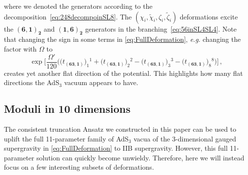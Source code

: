 \documentclass[a4paper, 11pt]{article}
\numberwithin{equation}{section}
\newcommand{\ts}[1]{\widetilde{#1}}
\newcommand{\+}{\oplus}
\begin{document}
where we denoted the generators according to the decomposition~\eqref{eq:248decompoinSL8}. The $(\chi_{i},\ts{\chi}_{i},\zeta_{i},\ts{\zeta}_{i})$ deformations excite the $(\mathbf{6},\mathbf{1})_{\mathbf{2}}$ and $(\mathbf{1},\mathbf{6})_{\mathbf{2}}$ generators in the branching~\eqref{eq:56inSL4SL4}. Note that changing the sign in some terms in \eqref{eq:FullDeformation}, \textit{e.g.} changing the factor with $\Omega$ to
\begin{equation}
	\exp\bigg[\frac{\Omega'}{120}\Big(\big(t_{(\mathbf{63},\mathbf{1})}\big)_{1}{}^{1}+\big(t_{(\mathbf{63},\mathbf{1})}\big)_{2}{}^{2}-\big(t_{(\mathbf{63},\mathbf{1})}\big)_{3}{}^{3}-\big(t_{(\mathbf{63},\mathbf{1})}\big)_{8}{}^{8}\Big) \bigg] \,,
\end{equation}
creates yet another flat direction of the potential. This highlights how many flat directions the AdS$_3$ vacuum appears to have.

\subsection{Moduli in 10 dimensions}
The consistent truncation Ansatz we constructed in this paper can be used to uplift the full 11-parameter family of AdS$_3$ vacua of the 3-dimensional gauged supergravity in \eqref{eq:FullDeformation} to IIB supergravity. However, this full 11-parameter solution can quickly become unwieldy. Therefore, here we will instead focus on a few interesting subsets of deformations.
\end{document}
